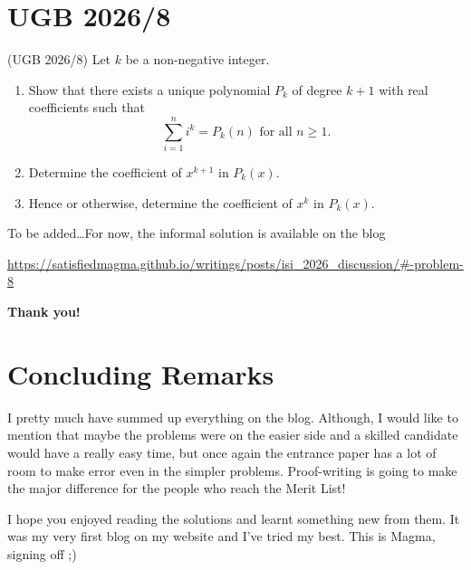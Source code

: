 \documentclass[numbers=endperiod, 11pt]{scrartcl}
\begin{document}
\section{UGB 2026/8}
\begin{prob*}{(UGB 2026/8)}{}
    Let $k$ be a non-negative integer.
    \begin{enumerate}
        \item Show that there exists a unique
              polynomial $P_k$ of degree $k+1$ with
              real coefficients such that
              \[\sum_{i=1}^{n} i^k = P_k(n) \text{ for all } n \geq 1.\]
        \item Determine the coefficient of
              $x^{k+1}$ in $P_k(x)$.
        \item Hence or otherwise, determine the
              coefficient of $x^k$ in $P_k(x)$.
    \end{enumerate}
\end{prob*}
\begin{sol}
    To be added\dots For now, the informal solution is
    available on the blog
    \begin{center}
        \small
        \url{https://satisfiedmagma.github.io/writings/posts/isi_2026_discussion/#-problem-8}
    \end{center}
    \textbf{Thank you!}
\end{sol}
\newpage

\section{Concluding Remarks}
I pretty much have summed up everything on the blog.
Although, I would like to mention that maybe the problems
were on the easier side and a skilled candidate would
have a really easy time, but once again the entrance
paper has a lot of room to make error even in the simpler
problems. Proof-writing is going to make the major difference
for the people who reach the Merit List!

I hope you enjoyed reading the solutions and
learnt something new from them. It was my very
first blog on my website and I've tried my best. This is
Magma, signing off ;)
\end{document}
